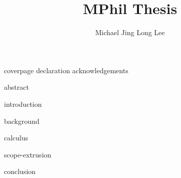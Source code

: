 \documentclass[12pt,a4paper,twoside,openany,BCOR=2cm]{scrbook}
\title{MPhil Thesis}
\author{Michael Jing Long Lee}
\begin{document}
\frontmatter
{
{coverpage}
{declaration}
{acknowledgements}

{abstract}

\hypersetup{linkcolor=black, linkbordercolor=white}
\tableofcontents

 }

\mainmatter
{introduction}

{background}

{calculus}

{scope-extrusion}


{conclusion}


\end{document}
